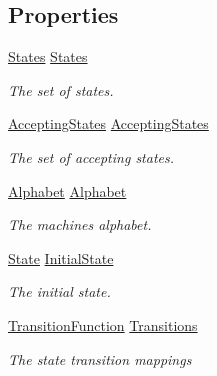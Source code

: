 \subsection*{Properties}
\begin{DoxyCompactItemize}
\item 
\mbox{\hyperlink{class_system_1_1_automata_1_1_states}{States}} \mbox{\hyperlink{class_system_1_1_automata_1_1_automaton_a21fc2f1e7cf4ee121de2547dc184dedf}{States}}
\begin{DoxyCompactList}\small\item\em The set of states. \end{DoxyCompactList}\item 
\mbox{\hyperlink{class_system_1_1_automata_1_1_accepting_states}{Accepting\+States}} \mbox{\hyperlink{class_system_1_1_automata_1_1_automaton_a393c78f68acc96e815f02a2f8ca34011}{Accepting\+States}}
\begin{DoxyCompactList}\small\item\em The set of accepting states. \end{DoxyCompactList}\item 
\mbox{\hyperlink{class_system_1_1_automata_1_1_alphabet}{Alphabet}} \mbox{\hyperlink{class_system_1_1_automata_1_1_automaton_ac18c40e73b9b787f2d3084e65110929d}{Alphabet}}
\begin{DoxyCompactList}\small\item\em The machine\textquotesingle{}s alphabet. \end{DoxyCompactList}\item 
\mbox{\hyperlink{class_system_1_1_automata_1_1_state}{State}} \mbox{\hyperlink{class_system_1_1_automata_1_1_automaton_a827b16190eb21a97ee14ff46274b0029}{Initial\+State}}
\begin{DoxyCompactList}\small\item\em The initial state. \end{DoxyCompactList}\item 
\mbox{\hyperlink{class_system_1_1_automata_1_1_transition_function}{Transition\+Function}} \mbox{\hyperlink{class_system_1_1_automata_1_1_automaton_ae109aca0f6f80efc50e9553cfe250ce5}{Transitions}}
\begin{DoxyCompactList}\small\item\em The state transition mappings \end{DoxyCompactList}\end{DoxyCompactItemize}


